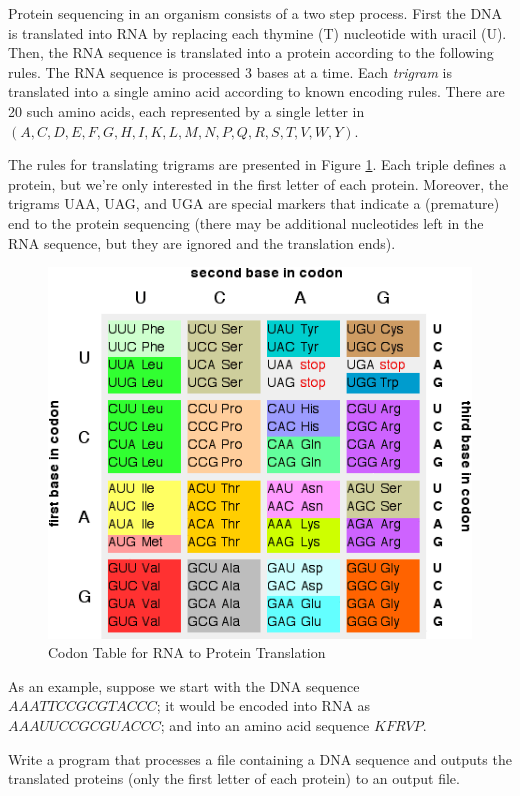 \begin{exer}
Protein sequencing in an organism consists of a two step 
process.  First the DNA is translated into RNA by replacing 
each thymine (T) nucleotide with uracil (U).  Then, the RNA 
sequence is translated into a protein according to the following 
rules.  The RNA sequence is processed 3 bases at a time.  
Each \emph{trigram} is translated into a single amino acid
according to known encoding rules.  There are 20 such amino 
acids, each represented by a single letter in $(A,C,D,E,F,G,H,I,K,L,M,N,P,Q,R,S,T,V,W,Y)$.

The rules for translating trigrams are presented in Figure 
\ref{figure:codonTable}.  Each triple defines a protein, 
but we're only interested in the first letter of each protein.
Moreover, the trigrams UAA, UAG, and UGA are special 
markers that indicate a (premature) end to the protein 
sequencing (there may be additional nucleotides left in the 
RNA sequence, but they are ignored and the translation 
ends).  

\begin{figure}[h]
\centering
\includegraphics[scale=0.60]{images/codonTable}
\caption{Codon Table for RNA to Protein Translation}
\label{figure:codonTable}
\end{figure}

As an example, suppose we start with the DNA sequence 
$AAATTCCGCGTACCC$; it would be encoded into RNA
as $AAAUUCCGCGUACCC$; and into an amino acid 
sequence $KFRVP$.

Write a program that processes a file containing a DNA
sequence and outputs the translated proteins (only the
first letter of each protein) to an output file.
\end{exer}

